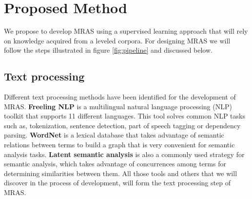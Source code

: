 \documentclass[12pt]{article}
\begin{document}
\section{Proposed Method}

We propose to develop MRAS using a supervised learning approach that will rely on knowledge acquired from a leveled corpora. For designing MRAS we will follow the steps illustrated in figure \ref{fig:pipeline} and discussed below.


\subsection{Text processing}

Different text processing methods have been identified for the development of MRAS. \textbf{Freeling NLP} \cite{padro12,padro10b} is a multilingual natural language processing (NLP) toolkit that supports 11 different languages. This tool solves common NLP tasks such as, tokenization, sentence detection, part of speech tagging or dependency parsing. \textbf{WordNet} is a lexical database that takes advantage of semantic relations between terms to build a graph that is very convenient for semantic analysis tasks. \textbf{Latent semantic analysis} is also a commonly used strategy  for semantic analysis, which takes advantage of concurrences among terms for determining similarities between them. All those tools and others that we will discover in the process of development, will form the text processing step of MRAS.



\end{document}
